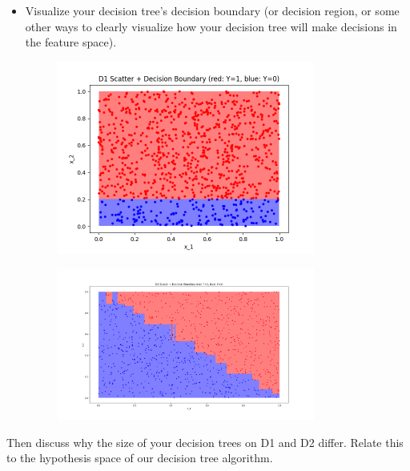 \documentclass[a4paper]{article}
\theoremstyle{definition}
\newenvironment{soln}{
    \leavevmode\color{blue}\ignorespaces
}{}
\begin{document}
\begin{enumerate}
\begin{itemize}
\newpage
  \item Visualize your decision tree's decision boundary (or decision region, or some other ways to clearly visualize how your decision tree will make decisions in the feature space).
  \begin{soln}
    \begin{figure}[h!]
        \centering
        \includegraphics[width=0.8\textwidth]{images/D1ScatterDecisionBoundary.png}  
        \captionsetup{labelformat=empty}
        \caption{}
        \label{fig:mixed}
    \end{figure}
    \begin{figure}[h!]
        \centering
        \includegraphics[width=0.8\textwidth]{images/D2ScatterDecisionBoundary.png}  
        \captionsetup{labelformat=empty}
        \caption{}
        \label{fig:mixed}
    \end{figure}
  \end{soln}

  \end{itemize}
Then discuss why the size of your decision trees on D1 and D2 differ.  Relate this to the hypothesis space of our decision tree algorithm. \\


\end{enumerate}
\end{document}
